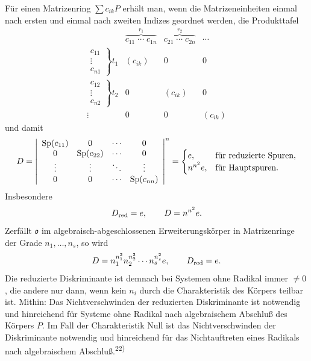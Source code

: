\documentclass[11pt]{article}
\providecommand{\mo}{\mathfrak{o}}
\begin{document}
Für einen Matrizenring $\sum c_{ik}P$ erhält man, wenn die Matrizeneinheiten einmal nach ersten und einmal nach zweiten Indizes geordnet werden, die Produkttafel
\[
\begin{array}{c|ccc}
& \overbrace{c_{11}\;\cdots\;c_{1n}}^{r_1}
& \overbrace{c_{21}\;\cdots\;c_{2n}}^{r_2}
& \cdots \\ \hline
\left.\begin{array}{c}c_{11}\\[-1mm]\vdots\\[-1mm]c_{n1}\end{array}\right\}t_1
& (c_{ik}) & 0 & 0 \\[1.3em]
\left.\begin{array}{c}c_{12}\\[-1mm]\vdots\\[-1mm]c_{n2}\end{array}\right\}t_2
& 0 & (c_{ik}) & 0 \\[1.3em]
\vdots & 0 & 0 & (c_{ik})
\end{array}
\]
und damit
\[
        D=\left|\begin{array}{cccc}
        \operatorname{Sp}(c_{11})&0&\cdots&0\\
        0&\operatorname{Sp}(c_{22})&\cdots&0\\
        \vdots&\vdots&\ddots&\vdots\\
        0&0&\cdots&\operatorname{Sp}(c_{nn})
        \end{array}\right|^{n}
        =\begin{cases}
        e, & \hbox{für reduzierte Spuren},\\
        n^{n^2}e, & \hbox{für Hauptspuren}.
        \end{cases}
\]
Insbesondere
\[
        D_{\rm red}=e,
        \qquad
        D=n^{n^2}e.
\]
Zerfällt $\mo$ im algebraisch-abgeschlossenen Erweiterungskörper in Matrizenringe der Grade $n_1,\ldots,n_s$, so wird
\[
        D=n_1^{n_1^2}n_2^{n_2^2}\cdots n_s^{n_s^2}e,
        \qquad
        D_{\rm red}=e.
\]
Die reduzierte Diskriminante ist demnach bei Systemen ohne Radikal immer $\ne0$, die andere nur dann, wenn kein $n_i$ durch die Charakteristik des Körpers teilbar ist. Mithin: Das Nichtverschwinden der reduzierten Diskriminante ist notwendig und hinreichend für Systeme ohne Radikal nach algebraischem Abschluß des Körpers $P$. Im Fall der Charakteristik Null ist das Nichtverschwinden der Diskriminante notwendig und hinreichend für das Nichtauftreten eines Radikals nach algebraischem Abschluß.\textsuperscript{22)}
\end{document}
